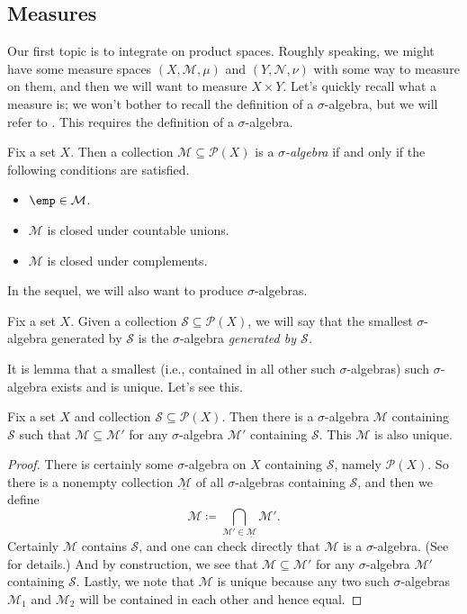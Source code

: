 \documentclass[../notes.tex]{subfiles}
\begin{document}
\subsection{Measures}
Our first topic is to integrate on product spaces. Roughly speaking, we might have some measure spaces $(X,\mathcal M,\mu)$ and $(Y,\mathcal N,\nu)$ with some way to measure on them, and then we will want to measure $X\times Y$. Let's quickly recall what a measure is; we won't bother to recall the definition of a $\sigma$-algebra, but we will refer to \cite[Definition~5.25]{elber-top}. This requires the definition of a $\sigma$-algebra.
\begin{defihelper}  \label{def:sigma-alg}
	Fix a set $X$. Then a collection $\mathcal M\subseteq\mathcal P(X)$ is a \textit{$\sigma$-algebra} if and only if the following conditions are satisfied.
	\begin{itemize}
		\item $\emp\in\mathcal M$.
		\item $\mathcal M$ is closed under countable unions.
		\item $\mathcal M$ is closed under complements.
	\end{itemize}
\end{defihelper}
In the sequel, we will also want to produce $\sigma$-algebras.
\begin{definition}
	Fix a set $X$. Given a collection $\mathcal S\subseteq\mathcal P(X)$, we will say that the smallest $\sigma$-algebra generated by $\mathcal S$ is the $\sigma$-algebra \textit{generated by $\mathcal S$.}
\end{definition}
It is lemma that a smallest (i.e., contained in all other such $\sigma$-algebras) such $\sigma$-algebra exists and is unique. Let's see this.
\begin{lemma}
	Fix a set $X$ and collection $\mathcal S\subseteq\mathcal P(X)$. Then there is a $\sigma$-algebra $\mathcal M$ containing $\mathcal S$ such that $\mathcal M\subseteq\mathcal M'$ for any $\sigma$-algebra $\mathcal M'$ containing $\mathcal S$. This $\mathcal M$ is also unique.
\end{lemma}
\begin{proof}
	There is certainly some $\sigma$-algebra on $X$ containing $\mathcal S$, namely $\mathcal P(X)$. So there is a nonempty collection $\underline{\mathcal M}$ of all $\sigma$-algebras containing $\mathcal S$, and then we define
	\[\mathcal M\coloneqq\bigcap_{\mathcal M'\in\underline{\mathcal M}}\mathcal M'.\]
	Certainly $\mathcal M$ contains $\mathcal S$, and one can check directly that $\mathcal M$ is a $\sigma$-algebra. (See \cite[Lemma~5.28]{elber-top} for details.) And by construction, we see that $\mathcal M\subseteq\mathcal M'$ for any $\sigma$-algebra $\mathcal M'$ containing $\mathcal S$. Lastly, we note that $\mathcal M$ is unique because any two such $\sigma$-algebras $\mathcal M_1$ and $\mathcal M_2$ will be contained in each other and hence equal.
\end{proof}
\end{document}
